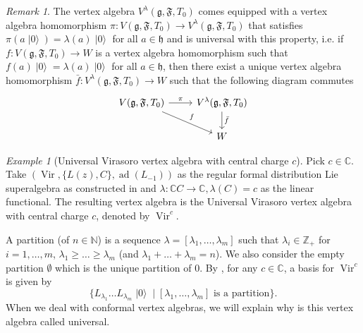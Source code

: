 \documentclass[a4paper, 12pt, reqno]{amsart}
\theoremstyle{remark}
\newtheorem{remark}[theorem]{Remark}
\newtheorem{example}[theorem]{Example}
\numberwithin{equation}{subsection}
\DeclareMathOperator{\Vir}{Vir}
\DeclareMathOperator{\vac}{|0\rangle}
\DeclareMathOperator{\ad}{ad}
\begin{document}
\begin{remark}
  \label{rmk:14}
  The vertex algebra $V^{\lambda}(\mathfrak{g}, \mathfrak{F}, T_0)$ comes equipped with a vertex algebra homomorphism $\pi: V(\mathfrak{g}, \mathfrak{F}, T_0) \to V^{\lambda}(\mathfrak{g}, \mathfrak{F}, T_0)$ that satisfies $\pi(a\vac) = \lambda(a)\vac$ for all $a \in \mathfrak{h}$ and is universal with this property, i.e. if $f: V(\mathfrak{g}, \mathfrak{F}, T_0)\to W$ is a vertex algebra homomorphism such that $f(a)\vac = \lambda(a)\vac$ for all $a \in \mathfrak{h}$, then there exist a unique vertex algebra homomorphism $\bar{f}: V^{\lambda}(\mathfrak{g}, \mathfrak{F}, T_0)\to W$ such that the following diagram commutes
  \begin{equation*}
    \begin{tikzcd}
      {V(\mathfrak{g}, \mathfrak{F}, T_0)} \arrow[rd, "f"] \arrow[r, "\pi"] & {V^\lambda(\mathfrak{g}, \mathfrak{F}, T_0)} \arrow[d, "\bar{f}"] \\
      & W                                                    
    \end{tikzcd}
  \end{equation*}
\end{remark}

\begin{example}[Universal Virasoro vertex algebra with central charge $c$]
  \label{exa:5}
  Pick $c \in \mathbb{C}$.
  Take $(\Vir, \{L(z), C\}, \ad(L_{-1}))$ as the regular formal distribution Lie superalgebra as constructed in  and $\lambda: \mathbb{C}C \to \mathbb{C}, \lambda(C) = c$ as the linear functional.
  The resulting vertex algebra is the Universal Virasoro vertex algebra with central charge $c$, denoted by $\Vir^c$.

  A partition (of $n \in \mathbb{N}$) is a sequence $\lambda = [\lambda_1, \dots, \lambda_m]$ such that $\lambda_i \in \mathbb{Z}_+$ for $i = 1, \dots, m$, $\lambda_1 \ge \dots \ge \lambda_m$ (and $\lambda_1 + \dots + \lambda_m = n$).
  We also consider the empty partition $\emptyset$ which is the unique partition of $0$.
  By , for any $c \in \mathbb{C}$, a basis for $\Vir^c$ is given by
  \begin{equation*}
    \{L_{\lambda_1}\dots L_{\lambda_m}\vac \mid [\lambda_1, \dots, \lambda_m]\text{ is a partition}\}.
  \end{equation*}
  When we deal with conformal vertex algebras, we will explain why is this vertex algebra called universal.
\end{example}
\end{document}

